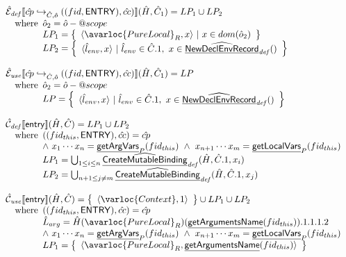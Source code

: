 \[
\begin{array}{l}
  \aE_{\it def}\lbr\hat{cp}\cfgnext_{\hat{C},\hat{o}}((fid,\SF{ENTRY}),\hat{cc})\rbr(\hat{H},\hat{C}_1) = LP_1 \cup LP_2\\
  \quad\wherec{
    \hat{o}_2=\hat{o}-\varprop{scope}\\
    LP_1 = \set{\langle \avarloc{PureLocal}_R, x \rangle~|~ x\in dom(\hat{o}_2)}\\
    LP_2 = \set{\langle \hat{l}_{env}, x\rangle ~|~ \hat{l}_{env}\in\hat{C}.1,\ x\in\ahf{NewDeclEnvRecord}_{\it def}()}\\
  }
  \\\\
  \aE_{\it use}\lbr\hat{cp}\cfgnext_{\hat{C},\hat{o}}((fid,\SF{ENTRY}),\hat{cc})\rbr(\hat{H},\hat{C}_1) = LP\\
  \quad\wherec{
    \hat{o}_2=\hat{o}-\varprop{scope}\\
    LP = \set{\langle \hat{l}_{env}, x\rangle ~|~ \hat{l}_{env}\in\hat{C}.1,\ x\in\ahf{NewDeclEnvRecord}_{\it def}()}\\
  }
  \\\\
  \aN_{\it def}\lbr\SF{entry}\rbr(\hat{H},\hat{C}) = LP_1 \cup LP_2\\
  \quad\wherec{
    (({fid_{this}},\SF{ENTRY}),\hat{cc}) = \acp \\
    \land\ x_1 \cdots x_n = \chf{getArgVars}_P(fid_{this})\ 
    \land\ x_{n+1} \cdots x_m = \chf{getLocalVars}_P(fid_{this}) \\
    LP_1 = \bigcup_{1\leq i\leq n}\ahf{CreateMutableBinding}_{\it def}(\hat{H},\hat{C}.1,x_i)\\
    LP_2 = \bigcup_{n+1\leq j\neq m}\ahf{CreateMutableBinding}_{\it def}(\hat{H},\hat{C}.1,x_j)\\
  }
  \\\\
  \aN_{\it use}\lbr\SF{entry}\rbr(\hat{H},\hat{C}) = \set{\langle\varloc{Context},1\rangle}\cup LP_1\cup LP_2\\
  \quad\wherec{
    (({fid_{this}},\SF{ENTRY}),\hat{cc}) = \acp \\
    \hat{L}_{arg} = \hat{H}(\avarloc{PureLocal}_R)(\chf{getArgumentsName}(fid_{this})).1.1.1.2 \\
    \land\ x_1 \cdots x_n = \chf{getArgVars}_P(fid_{this})\ 
    \land\ x_{n+1} \cdots x_m = \chf{getLocalVars}_P(fid_{this}) \\
    LP_1 = \set{\langle \avarloc{PureLocal}_R, \chf{getArgumentsName}(fid_{this})\rangle}\\
}
\end{array}\]
